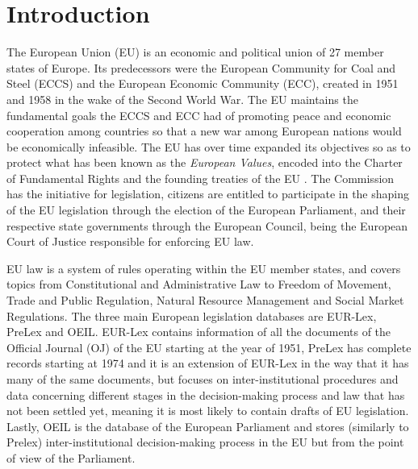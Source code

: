 \documentclass[sigconf, authorversion]{acmart}
\begin{document}

\maketitle

\section{Introduction}
\label{intro}
The European Union (EU) is an economic and political union of 27 member states of Europe. Its predecessors were the European Community for Coal and Steel (ECCS) and the European Economic Community (ECC), created in 1951 and 1958 in the wake of the Second World War. The EU maintains the fundamental goals the ECCS and ECC had of promoting peace and economic cooperation among countries so that a new war among European nations would be economically infeasible. The EU has over time expanded its objectives so as to protect what has been known as the \textit{European Values}, encoded into the Charter of Fundamental Rights \cite{cfr} and the founding treaties of the EU \cite{teu, tfeu}.
The Commission has the initiative for legislation, citizens are entitled to participate in the shaping of the EU legislation through the election of the European Parliament, and their respective state governments through the European Council, being the European Court of Justice responsible for enforcing EU law.

EU law is a system of rules operating within the EU member states, and covers topics from Constitutional and Administrative Law to Freedom of Movement, Trade and Public Regulation, Natural Resource Management and Social Market Regulations.
The three main European legislation databases are EUR-Lex, PreLex and OEIL. EUR-Lex contains information of all the documents of the Official Journal (OJ) of the EU starting at the year of 1951, PreLex has complete records starting at 1974 and it is an extension of EUR-Lex in the way that it has many of the same documents, but focuses on inter-institutional procedures and data concerning different stages in the decision-making process and law that has not been settled yet, meaning it is most likely to contain drafts of EU legislation. Lastly, OEIL is the database of the European Parliament and stores (similarly to Prelex) inter-institutional decision-making process in the EU but from the point of view of the Parliament.
\end{document}
